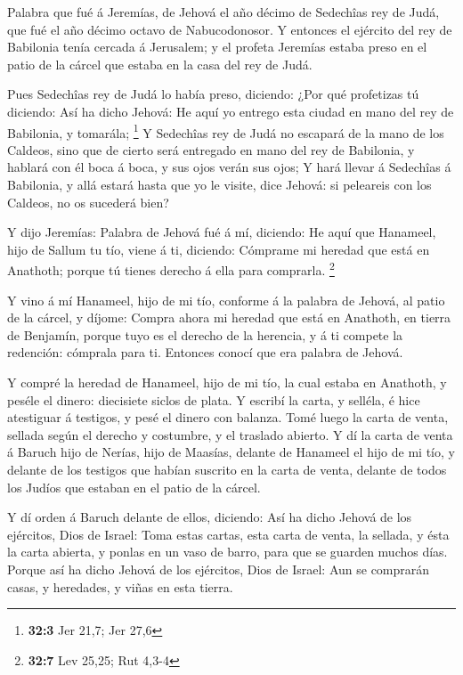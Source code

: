  Palabra que fué á Jeremías, de Jehová el año décimo de
Sedechîas rey de Judá, que fué el año décimo octavo de Nabucodonosor.
 Y entonces el ejército del rey de Babilonia tenía cercada á
Jerusalem; y el profeta Jeremías estaba preso en el patio de la cárcel
que estaba en la casa del rey de Judá.

 Pues Sedechîas rey de Judá lo había preso, diciendo: ¿Por
qué profetizas tú diciendo: Así ha dicho Jehová: He aquí yo entrego esta
ciudad en mano del rey de Babilonia, y tomarála; \footnote{\textbf{32:3}
  Jer 21,7; Jer 27,6}  Y Sedechîas rey de Judá no escapará
de la mano de los Caldeos, sino que de cierto será entregado en mano del
rey de Babilonia, y hablará con él boca á boca, y sus ojos verán sus
ojos;  Y hará llevar á Sedechîas á Babilonia, y allá estará
hasta que yo le visite, dice Jehová: si peleareis con los Caldeos, no os
sucederá bien?

 Y dijo Jeremías: Palabra de Jehová fué á mí, diciendo:
 He aquí que Hanameel, hijo de Sallum tu tío, viene á ti,
diciendo: Cómprame mi heredad que está en Anathoth; porque tú tienes
derecho á ella para comprarla. \footnote{\textbf{32:7} Lev 25,25; Rut
  4,3-4}

 Y vino á mí Hanameel, hijo de mi tío, conforme á la palabra
de Jehová, al patio de la cárcel, y díjome: Compra ahora mi heredad que
está en Anathoth, en tierra de Benjamín, porque tuyo es el derecho de la
herencia, y á ti compete la redención: cómprala para ti. Entonces conocí
que era palabra de Jehová.

 Y compré la heredad de Hanameel, hijo de mi tío, la cual
estaba en Anathoth, y peséle el dinero: diecisiete siclos de plata.
 Y escribí la carta, y selléla, é hice atestiguar á
testigos, y pesé el dinero con balanza.  Tomé luego la
carta de venta, sellada según el derecho y costumbre, y el traslado
abierto.  Y dí la carta de venta á Baruch hijo de Nerías,
hijo de Maasías, delante de Hanameel el hijo de mi tío, y delante de los
testigos que habían suscrito en la carta de venta, delante de todos los
Judíos que estaban en el patio de la cárcel.

 Y dí orden á Baruch delante de ellos, diciendo:
 Así ha dicho Jehová de los ejércitos, Dios de Israel: Toma
estas cartas, esta carta de venta, la sellada, y ésta la carta abierta,
y ponlas en un vaso de barro, para que se guarden muchos días.
 Porque así ha dicho Jehová de los ejércitos, Dios de
Israel: Aun se comprarán casas, y heredades, y viñas en esta tierra.

